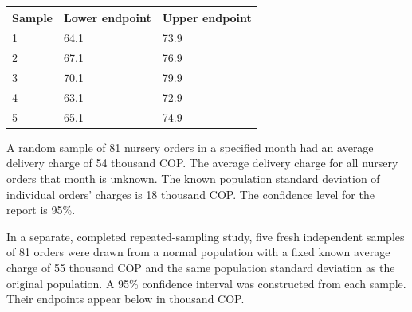 \begin{center}\begin{tabular}{@{}lll@{}}\toprule
Sample & Lower endpoint & Upper endpoint\\\midrule
1 & 64.1 & 73.9\\
2 & 67.1 & 76.9\\
3 & 70.1 & 79.9\\
4 & 63.1 & 72.9\\
5 & 65.1 & 74.9\\
\bottomrule\end{tabular}\end{center}


\BlankInformationTable

\clearpage
{}

\workspace{1.5in}
\vfill


\clearpage
{}
A random sample of 81 nursery orders in a specified month had an average delivery charge of 54 thousand COP. The average delivery charge for all nursery orders that month is unknown. The known population standard deviation of individual orders' charges is 18 thousand COP. The confidence level for the report is 95\%.

In a separate, completed repeated-sampling study, five fresh independent samples of 81 orders were drawn from a normal population with a fixed known average charge of 55 thousand COP and the same population standard deviation as the original population. A 95\% confidence interval was constructed from each sample. Their endpoints appear below in thousand COP.

